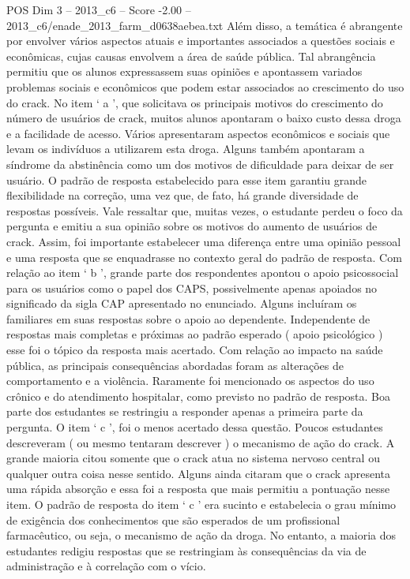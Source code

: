 \begin{textsample}{POS Dim 3 – 2013\_c6 – Score -2.00 – 2013\_c6/enade\_2013\_farm\_d0638aebea.txt}
Além disso, a temática é abrangente por envolver vários aspectos atuais e importantes associados a questões sociais e econômicas, cujas causas envolvem a área de saúde pública.
Tal abrangência permitiu que os alunos expressassem suas opiniões e apontassem variados problemas sociais e econômicos que podem estar associados ao crescimento do uso do crack.
No item ‘ a ’, que solicitava os principais motivos do crescimento do número de usuários de crack, muitos alunos apontaram o baixo custo dessa droga e a facilidade de acesso.
Vários apresentaram aspectos econômicos e sociais que levam os indivíduos a utilizarem esta droga.
Alguns também apontaram a síndrome da abstinência como um dos motivos de dificuldade para deixar de ser usuário.
O padrão de resposta estabelecido para esse item garantiu grande flexibilidade na correção, uma vez que, de fato, há grande diversidade de respostas possíveis.
Vale ressaltar que, muitas vezes, o estudante perdeu o foco da pergunta e emitiu a sua opinião sobre os motivos do aumento de usuários de crack.
Assim, foi importante estabelecer uma diferença entre uma opinião pessoal e uma resposta que se enquadrasse no contexto geral do padrão de resposta.
Com relação ao item ‘ b ’, grande parte dos respondentes apontou o apoio psicossocial para os usuários como o papel dos CAPS, possivelmente apenas apoiados no significado da sigla CAP apresentado no enunciado.
Alguns incluíram os familiares em suas respostas sobre o apoio ao dependente.
Independente de respostas mais completas e próximas ao padrão esperado ( apoio psicológico ) esse foi o tópico da resposta mais acertado.
Com relação ao impacto na saúde pública, as principais consequências abordadas foram as alterações de comportamento e a violência.
Raramente foi mencionado os aspectos do uso crônico e do atendimento hospitalar, como previsto no padrão de resposta.
Boa parte dos estudantes se restringiu a responder apenas a primeira parte da pergunta.
O item ‘ c ’, foi o menos acertado dessa questão.
Poucos estudantes descreveram ( ou mesmo tentaram descrever ) o mecanismo de ação do crack.
A grande maioria citou somente que o crack atua no sistema nervoso central ou qualquer outra coisa nesse sentido.
Alguns ainda citaram que o crack apresenta uma rápida absorção e essa foi a resposta que mais permitiu a pontuação nesse item.
O padrão de resposta do item ‘ c ’ era sucinto e estabelecia o grau mínimo de exigência dos conhecimentos que são esperados de um profissional farmacêutico, ou seja, o mecanismo de ação da droga.
No entanto, a maioria dos estudantes redigiu respostas que se restringiam às consequências da via de administração e à correlação com o vício.

\end{textsample}
